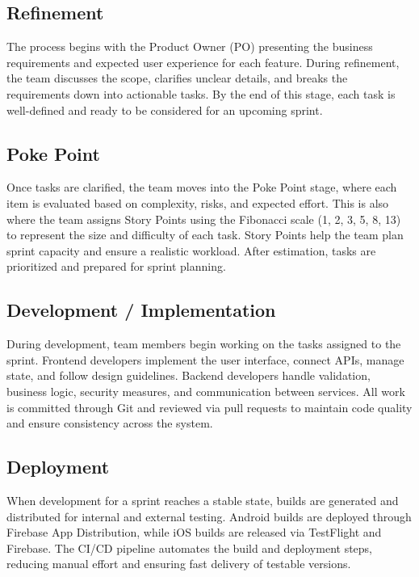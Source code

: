 \documentclass[12pt,oneside,openright,a4paper]{cpe-english-project}
\begin{document}
\subsection{Refinement}

The process begins with the Product Owner (PO) presenting the business
requirements and expected user experience for each feature. During
refinement, the team discusses the scope, clarifies unclear details, and
breaks the requirements down into actionable tasks. By the end of this
stage, each task is well-defined and ready to be considered for an
upcoming sprint.

\subsection{Poke Point}

Once tasks are clarified, the team moves into the Poke Point stage,
where each item is evaluated based on complexity, risks, and expected
effort. This is also where the team assigns Story Points using the
Fibonacci scale (1, 2, 3, 5, 8, 13) to represent the size and difficulty
of each task. Story Points help the team plan sprint capacity and ensure
a realistic workload. After estimation, tasks are prioritized and
prepared for sprint planning.

\subsection{Development / Implementation}

During development, team members begin working on the tasks assigned to
the sprint. Frontend developers implement the user interface, connect
APIs, manage state, and follow design guidelines. Backend developers
handle validation, business logic, security measures, and communication
between services. All work is committed through Git and reviewed via
pull requests to maintain code quality and ensure consistency across the
system.

\subsection{Deployment}

When development for a sprint reaches a stable state, builds are
generated and distributed for internal and external testing. Android
builds are deployed through Firebase App Distribution, while iOS builds
are released via TestFlight and Firebase. The CI/CD pipeline automates
the build and deployment steps, reducing manual effort and ensuring fast
delivery of testable versions.
\end{document}
